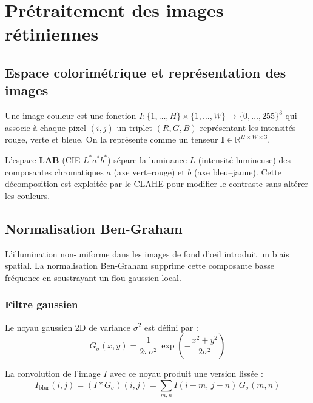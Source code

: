 \documentclass[11pt,a4paper]{article}
\newcommand{\R}{\mathbb{R}}
\begin{document}
\section{Prétraitement des images rétiniennes}

\subsection{Espace colorimétrique et représentation des images}

\begin{defbox}
Une image couleur est une fonction $I : \{1,\ldots,H\} \times \{1,\ldots,W\} \to \{0,\ldots,255\}^3$ qui associe à chaque pixel $(i,j)$ un triplet $(R,G,B)$ représentant les intensités rouge, verte et bleue. On la représente comme un tenseur $\mathbf{I} \in \R^{H \times W \times 3}$.
\end{defbox}

L'espace \textbf{LAB} (CIE $L^*a^*b^*$) sépare la luminance $L$ (intensité lumineuse) des composantes chromatiques $a$ (axe vert--rouge) et $b$ (axe bleu--jaune). Cette décomposition est exploitée par le CLAHE pour modifier le contraste sans altérer les couleurs.

\subsection{Normalisation Ben-Graham}

\begin{defbox}[Principe]
L'illumination non-uniforme dans les images de fond d'œil introduit un biais spatial. La normalisation Ben-Graham supprime cette composante basse fréquence en soustrayant un flou gaussien local.
\end{defbox}

\subsubsection{Filtre gaussien}

Le noyau gaussien 2D de variance $\sigma^2$ est défini par :
\begin{equation}
  G_\sigma(x,y) = \frac{1}{2\pi\sigma^2}\,\exp\!\left(-\frac{x^2+y^2}{2\sigma^2}\right)
\end{equation}

La convolution de l'image $I$ avec ce noyau produit une version lissée :
\begin{equation}
  I_{\text{blur}}(i,j) = (I * G_\sigma)(i,j) = \sum_{m,n} I(i-m,\,j-n)\,G_\sigma(m,n)
\end{equation}
\end{document}
